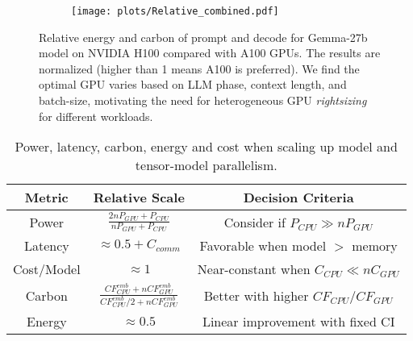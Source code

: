 \begin{figure}[!t]
\centering
    \begin{subfigure}[b]{\linewidth}
    \texttt{[image: plots/Relative\_combined.pdf]}
        \label{fig:relative_carbon}
    \end{subfigure}
\vspace{-2em}    
\caption{Relative energy and carbon of prompt and decode for Gemma-27b model on NVIDIA H100 compared with A100 GPUs. The results are normalized (higher than 1 means  A100 is preferred). 
We find the optimal GPU varies based on LLM phase, context length, and batch-size, motivating the need for heterogeneous GPU \textit{rightsizing} for different workloads.}
\label{fig:relative_carbon}
\vspace{-1em}
\end{figure}

\begin{table}[h]
\centering \footnotesize
\begin{tabular}{ccc}\hline
\textbf{Metric} & \textbf{Relative Scale} & \textbf{Decision Criteria} \\ 
\hline
Power & $\frac{2n P_{GPU} + P_{CPU}}{n P_{GPU} + P_{CPU}}$ & Consider if $P_{CPU} \gg n P_{GPU}$ \\
Latency & $\approx 0.5 + C_{comm}$ & Favorable when model $>$ memory  \\
Cost/Model & $\approx 1$ & Near-constant when $C_{CPU} \ll n C_{GPU}$ \\
 Carbon & $\frac{CF^{emb}_{CPU} + n CF^{emb}_{GPU}}{CF^{emb}_{CPU}/2 + n CF^{emb}_{GPU}}$ & Better with higher $CF_{CPU}/CF_{GPU}$ \\
Energy & $\approx 0.5$ & Linear improvement with fixed CI \\
\hline 
\end{tabular} \caption{Power, latency, carbon, energy and cost when scaling up model and tensor-model parallelism.}\label{tab:tp}
\vspace{-2em}
\end{table}




 